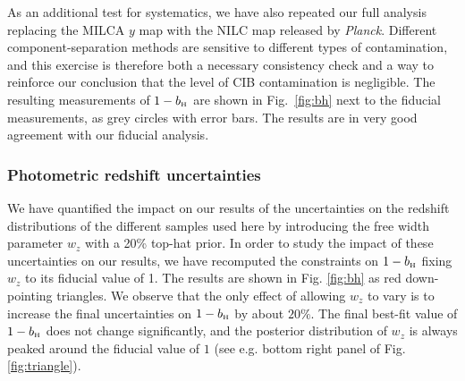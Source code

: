 \documentclass[useAMS,usenatbib]{mn2e}
\def\bH{b_{\scriptscriptstyle\rm H}}
\def\planck{{\it Planck\/}}
\begin{document}
      As an additional test for systematics, we have also repeated our full analysis replacing the MILCA $y$ map with the NILC map released by \planck. Different component-separation methods are sensitive to different types of contamination, and this exercise is therefore both a necessary consistency check and a way to reinforce our conclusion that the level of CIB contamination is negligible. The resulting measurements of $1-\bH$ are shown in Fig.\!~\ref{fig:bh} next to the fiducial measurements, as grey circles with error bars. The results are in very good agreement with our fiducial analysis.
      
      \subsubsection{Photometric redshift uncertainties}\label{sssec:results.syst.pz}
      We have quantified the impact on our results of the uncertainties on the redshift distributions of the different samples used here by introducing the free width parameter $w_z$ with a 20\% top-hat prior. In order to study the impact of these uncertainties on our results, we have recomputed the constraints on $1-\bH$ fixing $w_z$ to its fiducial value of 1. The results are shown in Fig. \ref{fig:bh} as red down-pointing triangles. We observe that the only effect of allowing $w_z$ to vary is to increase the final uncertainties on $1-\bH$ by about $20\%$. The final best-fit value of $1-\bH$ does not change significantly, and the posterior distribution of $w_z$ is always peaked around the fiducial value of $1$ (see e.g. bottom right panel of Fig. \ref{fig:triangle}).
      
\end{document}
